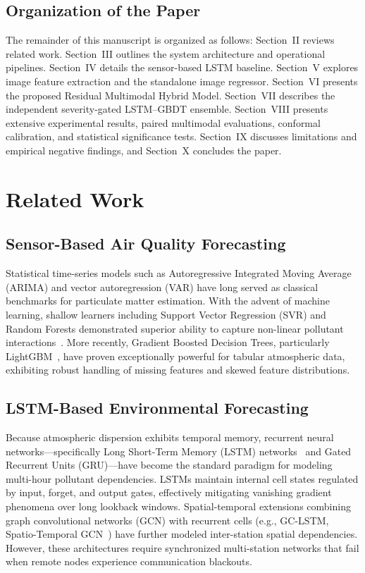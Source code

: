 \documentclass[conference]{IEEEtran}
\begin{document}
\subsection{Organization of the Paper}
The remainder of this manuscript is organized as follows: Section~II reviews related work. Section~III outlines the system architecture and operational pipelines. Section~IV details the sensor-based LSTM baseline. Section~V explores image feature extraction and the standalone image regressor. Section~VI presents the proposed Residual Multimodal Hybrid Model. Section~VII describes the independent severity-gated LSTM--GBDT ensemble. Section~VIII presents extensive experimental results, paired multimodal evaluations, conformal calibration, and statistical significance tests. Section~IX discusses limitations and empirical negative findings, and Section~X concludes the paper.

\section{Related Work}

\subsection{Sensor-Based Air Quality Forecasting}
Statistical time-series models such as Autoregressive Integrated Moving Average (ARIMA) and vector autoregression (VAR) have long served as classical benchmarks for particulate matter estimation. With the advent of machine learning, shallow learners including Support Vector Regression (SVR) and Random Forests demonstrated superior ability to capture non-linear pollutant interactions~\cite{zheng2015forecasting}. More recently, Gradient Boosted Decision Trees, particularly LightGBM~\cite{ke2017lightgbm}, have proven exceptionally powerful for tabular atmospheric data, exhibiting robust handling of missing features and skewed feature distributions.

\subsection{LSTM-Based Environmental Forecasting}
Because atmospheric dispersion exhibits temporal memory, recurrent neural networks—specifically Long Short-Term Memory (LSTM) networks~\cite{hochreiter1997lstm} and Gated Recurrent Units (GRU)—have become the standard paradigm for modeling multi-hour pollutant dependencies. LSTMs maintain internal cell states regulated by input, forget, and output gates, effectively mitigating vanishing gradient phenomena over long lookback windows. Spatial-temporal extensions combining graph convolutional networks (GCN) with recurrent cells (e.g., GC-LSTM, Spatio-Temporal GCN~\cite{lin2018exploiting, qi2018deep, wang2020spatial}) have further modeled inter-station spatial dependencies. However, these architectures require synchronized multi-station networks that fail when remote nodes experience communication blackouts.
\end{document}
